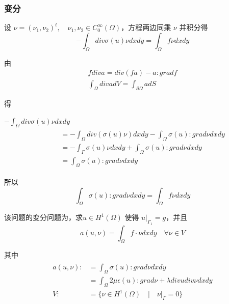 \documentclass[a4paper,UTF8,titlepage]{ctexart}
\begin{document}
\subsubsection{变分}

设 $\nu = (\nu_1,\nu_2)^t, \quad \nu_1, \nu_2 \in C_0^{\infty}(\Omega)$，方程两边同乘 $\nu$ 并积分得
$$
-\int_{\Omega} div \sigma(u) \nu dxdy = \int_{\Omega} f \nu dxdy
$$

由
$$
\begin{matrix}
	f div a = div(fa) - a : grad f \\
	\int_{\Omega} div a dV = \int_{\partial \Omega} a dS
\end{matrix}
$$

得
\par \quad \quad
$-\int_{\Omega} div \sigma(u) \nu dxdy$
$$ 
\quad \quad
\begin{matrix}
	\begin{aligned}
		&= -\int_{\Omega} div(\sigma(u) \nu) dxdy - \int_{\Omega} \sigma(u) : grad \nu dxdy \\
		&= -\int_{\Gamma} \sigma(u) \nu dxdy + \int_{\Omega} \sigma(u) : grad \nu dxdy \\
		&= \int_{\Omega} \sigma(u) : grad \nu dxdy 
	\end{aligned}
\end{matrix}
$$

所以
$$
\int_{\Omega} \sigma(u) : grad \nu dxdy = \int_{\Omega} f \nu dxdy
$$

该问题的变分问题为，求$u \in H^1(\Omega)$ 使得 $u |_{\Gamma_1} = g$，并且
$$
	a(u,\nu) = \int_{\Omega} f \cdot \nu dxdy \quad \forall \nu \in V
$$ 
\par
其中
$$
	\begin{matrix}
		\begin{aligned}
			a(u,\nu) :&= \int_{\Omega} \sigma(u) : grad \nu dxdy \\  
			&= \int_{\Omega} 2 \mu \epsilon(u) : grad \nu + \lambda div u div \nu dxdy \\
			V :&= \{ \nu \in H^1(\Omega) \quad | \quad \nu |_{\Gamma} = 0 \}
		\end{aligned}
	\end{matrix}
$$


\end{document}
